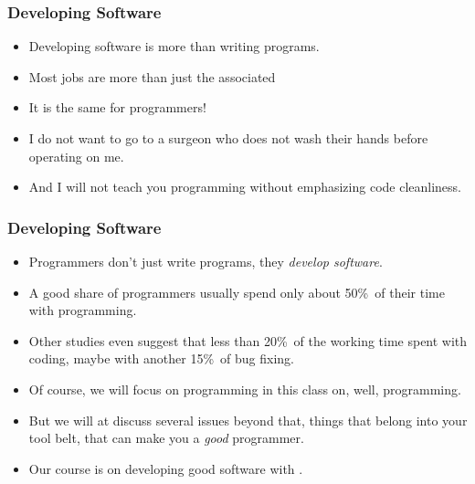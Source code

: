 \documentclass[aspectratio=169,mathserif,notheorems]{beamer}%
\begin{document}
%
%
\begin{frame}%
\frametitle{Developing Software}%
\begin{itemize}%
\item Developing software is more than writing programs.%
\item<2-> Most jobs are more than just the associated %
\item<6-> It is the same for programmers!%
\item<10-> I do not want to go to a surgeon who does not wash their hands before operating on me.%
\item<11-> And I will not teach you programming without emphasizing code cleanliness.%
\end{itemize}%
\end{frame}%
%
%
\begin{frame}%
\frametitle{Developing Software}%
%
\begin{itemize}%
\item Programmers don't just write programs, they \emph{develop software}.%
\item<2-> A good share of programmers usually spend only about 50\%~of their time with programming\cite{T2019MOSWBFDHOT2TMOSS,AS2019DS2OSRP}.%
\item<3-> Other studies even suggest that less than 20\%~of the working time spent with coding, maybe with another 15\%~of bug fixing\cite{MAGTOC2024EHFAP}.%
%
\item<4-> Of course, we will focus on programming in this class on, well, programming.%
%
\item<5-> But we will at discuss several issues beyond that, things that belong into your tool belt, that can make you a \emph{good} programmer.%
%
\item<6-> Our course is on developing good software with \python.%
\end{itemize}%
\end{frame}%
%
%
\end{document}
